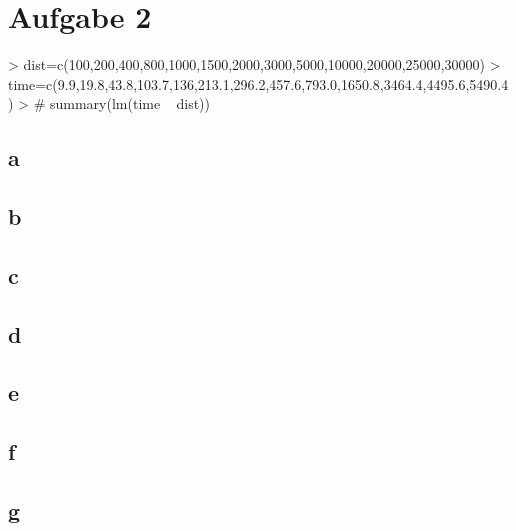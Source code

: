 
\section{Aufgabe 2}
\begin{Schunk}
\begin{Sinput}
> dist=c(100,200,400,800,1000,1500,2000,3000,5000,10000,20000,25000,30000)
> time=c(9.9,19.8,43.8,103.7,136,213.1,296.2,457.6,793.0,1650.8,3464.4,4495.6,5490.4)
> # summary(lm(time ~ dist))
\end{Sinput}
\end{Schunk}

\subsection{a}

\subsection{b}

\subsection{c}

\subsection{d}

\subsection{e}

\subsection{f}

\subsection{g}


